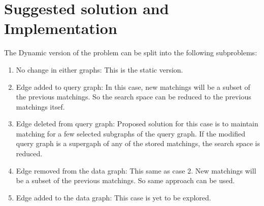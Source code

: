 \documentclass[
10pt, %
a4paper, %
oneside, %
headinclude,footinclude, %
BCOR5mm, %
]{scrartcl}
\begin{document}
\newpage




\section{Suggested solution and Implementation}

The Dynamic version of the problem can be split into the following subproblems:

\begin{enumerate}
    \item No change in either graphs: This is the static version.
    \item Edge added to query graph: In this case, new matchings will be a subset of the previous matchings. So the search space can be reduced to the previous matchings itsef.
    \item Edge deleted from query graph: Proposed solution for this case is to maintain matching for a few selected subgraphs of the query graph. If the modified query graph is a supergaph of any of the stored matchings, the search space is reduced.
    \item Edge removed from the data graph: This same as case 2. New matchings will be a subset of the previous matchings. So same approach can be used.
    \item Edge added to the data graph: This case is yet to be explored.
\end{enumerate}

\renewcommand{\refname}{\spacedlowsmallcaps{References}} %


\end{document}
